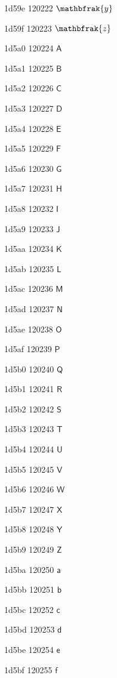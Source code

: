 \documentclass[11pt]{article}
\begin{document}
1d59e 120222 \ensuremath{\mathbfrak{y}}

1d59f 120223 \ensuremath{\mathbfrak{z}}

1d5a0 120224 \ensuremath{\mathsf{A}}

1d5a1 120225 \ensuremath{\mathsf{B}}

1d5a2 120226 \ensuremath{\mathsf{C}}

1d5a3 120227 \ensuremath{\mathsf{D}}

1d5a4 120228 \ensuremath{\mathsf{E}}

1d5a5 120229 \ensuremath{\mathsf{F}}

1d5a6 120230 \ensuremath{\mathsf{G}}

1d5a7 120231 \ensuremath{\mathsf{H}}

1d5a8 120232 \ensuremath{\mathsf{I}}

1d5a9 120233 \ensuremath{\mathsf{J}}

1d5aa 120234 \ensuremath{\mathsf{K}}

1d5ab 120235 \ensuremath{\mathsf{L}}

1d5ac 120236 \ensuremath{\mathsf{M}}

1d5ad 120237 \ensuremath{\mathsf{N}}

1d5ae 120238 \ensuremath{\mathsf{O}}

1d5af 120239 \ensuremath{\mathsf{P}}

1d5b0 120240 \ensuremath{\mathsf{Q}}

1d5b1 120241 \ensuremath{\mathsf{R}}

1d5b2 120242 \ensuremath{\mathsf{S}}

1d5b3 120243 \ensuremath{\mathsf{T}}

1d5b4 120244 \ensuremath{\mathsf{U}}

1d5b5 120245 \ensuremath{\mathsf{V}}

1d5b6 120246 \ensuremath{\mathsf{W}}

1d5b7 120247 \ensuremath{\mathsf{X}}

1d5b8 120248 \ensuremath{\mathsf{Y}}

1d5b9 120249 \ensuremath{\mathsf{Z}}

1d5ba 120250 \ensuremath{\mathsf{a}}

1d5bb 120251 \ensuremath{\mathsf{b}}

1d5bc 120252 \ensuremath{\mathsf{c}}

1d5bd 120253 \ensuremath{\mathsf{d}}

1d5be 120254 \ensuremath{\mathsf{e}}

1d5bf 120255 \ensuremath{\mathsf{f}}
\end{document}

